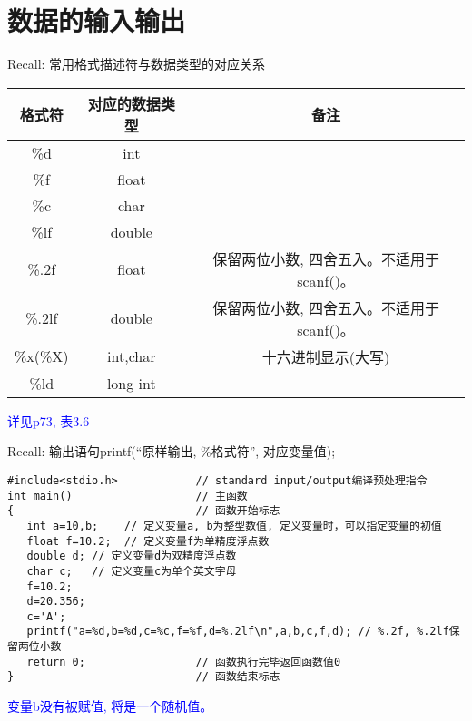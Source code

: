 
\section{数据的输入输出}

\begin{frame}{Recall: 常用格式描述符与数据类型的对应关系}
\centering
\begin{tabular}{|c|c|c|}
	\hline 
	\textbf{格式符} & \textbf{对应的数据类型} &  \textbf{备注}\\ 
	\hline 
	\%d & int &  \\ 
	\hline  
	\%f & float &  \\
	\hline
	\%c & char & \\ 
	\hline   
	\%lf & double & \\ 
	\hline 
	\%.2f & float & 保留两位小数, 四舍五入。不适用于scanf()。 \\ 
	\hline 
	\%.2lf & double & 保留两位小数, 四舍五入。不适用于scanf()。 \\ 
	\hline   
	\%x(\%X) & int,char & 十六进制显示(大写) \\ 
	\hline 
	\%ld & long int &  \\ 
	\hline 
\end{tabular}
\newline
\newline
\textcolor{blue}{详见p73, 表3.6}
\end{frame}

\begin{frame}{Recall: 输出语句printf(``原样输出, \%格式符'', 对应变量值);}
\begin{lstlisting}
#include<stdio.h>            // standard input/output编译预处理指令
int main()                   // 主函数
{                            // 函数开始标志
   int a=10,b;    // 定义变量a, b为整型数值, 定义变量时，可以指定变量的初值
   float f=10.2;  // 定义变量f为单精度浮点数
   double d; // 定义变量d为双精度浮点数
   char c;   // 定义变量c为单个英文字母
   f=10.2;
   d=20.356;
   c='A';
   printf("a=%d,b=%d,c=%c,f=%f,d=%.2lf\n",a,b,c,f,d); // %.2f, %.2lf保留两位小数
   return 0;                 // 函数执行完毕返回函数值0
}                            // 函数结束标志
\end{lstlisting}
\textcolor{blue}{变量b没有被赋值, 将是一个随机值。}
\end{frame}

